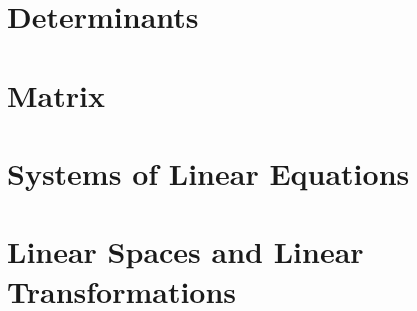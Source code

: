 \documentclass{report}
\begin{document}
	
	\thispagestyle{empty}
	\newpage%
	\tableofcontents
  
  \chapter{Determinants}
  
  \chapter{Matrix}
  
  \chapter{Systems of Linear Equations}
  
  \chapter{Linear Spaces and Linear Transformations}
  
  


  


  
\end{document}
